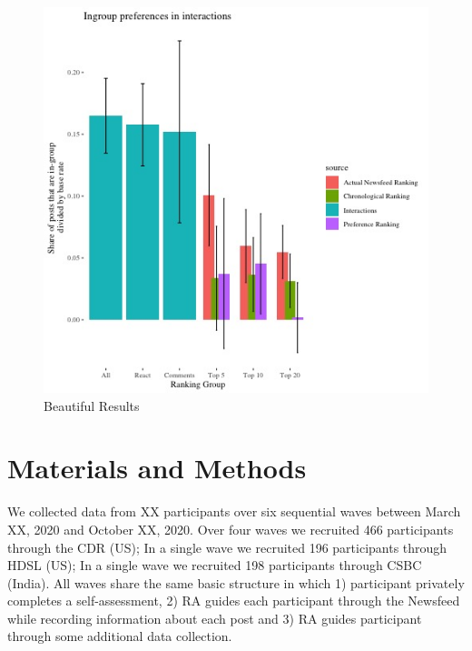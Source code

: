 \documentclass[12pt,letterpaper]{article}
\begin{document}
\begin{figure}[!h]
    \centering
    \includegraphics[width=1\linewidth]{Output/Graphs/Audit/Interactions/US preferences reactions and actual rankings above base rate.jpg}
    \caption{Beautiful Results}
    \label{fig:behavior}
\end{figure}


\FloatBarrier
\clearpage
\appendix
\renewcommand\thefigure{\thesection.\arabic{figure}}
\renewcommand\thetable{\thesection.\arabic{table}}

\section{Materials and Methods}\label{app:materials}

We collected data from XX participants over six sequential waves between March XX, 2020 and October XX, 2020. Over four waves we recruited 466 participants through the CDR (US); In a single wave we recruited 196 participants through HDSL (US); In a single wave we recruited 198 participants through CSBC (India). All waves share the same basic structure in which 1) participant privately completes a self-assessment, 2) RA guides each participant through the Newsfeed while recording information about each post and 3) RA guides participant through some additional data collection.
\end{document}
